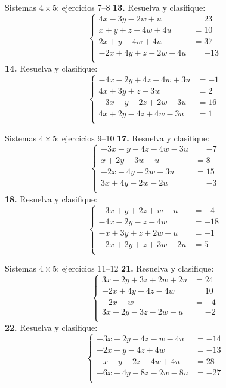 \documentclass[aspectratio=169]{beamer}
\begin{document}
\begin{frame}{Sistemas $4\times 5$: ejercicios 7--8}
\scriptsize
\textbf{13.} Resuelva y clasifique:
\[\left\{\begin{aligned}
4x-3y-2w+u&=23\\
x+y+z+4w+4u&=10\\
2x+y-4w+4u&=37\\
-2x+4y+z-2w-4u&=-13\\
\end{aligned}\right.\]
\textbf{14.} Resuelva y clasifique:
\[\left\{\begin{aligned}
-4x-2y+4z-4w+3u&=-1\\
4x+3y+z+3w&=2\\
-3x-y-2z+2w+3u&=16\\
4x+2y-4z+4w-3u&=1\\
\end{aligned}\right.\]
\end{frame}
\begin{frame}{Sistemas $4\times 5$: ejercicios 9--10}
\scriptsize
\textbf{17.} Resuelva y clasifique:
\[\left\{\begin{aligned}
-3x-y-4z-4w-3u&=-7\\
x+2y+3w-u&=8\\
-2x-4y+2w-3u&=15\\
3x+4y-2w-2u&=-3\\
\end{aligned}\right.\]
\textbf{18.} Resuelva y clasifique:
\[\left\{\begin{aligned}
-3x+y+2z+w-u&=-4\\
-4x-2y-z-4w&=-18\\
-x+3y+z+2w+u&=-1\\
-2x+2y+z+3w-2u&=5\\
\end{aligned}\right.\]
\end{frame}
\begin{frame}{Sistemas $4\times 5$: ejercicios 11--12}
\scriptsize
\textbf{21.} Resuelva y clasifique:
\[\left\{\begin{aligned}
3x-2y+3z+2w+2u&=24\\
-2x+4y+4z-4w&=10\\
-2x-w&=-4\\
3x+2y-3z-2w-u&=-2\\
\end{aligned}\right.\]
\textbf{22.} Resuelva y clasifique:
\[\left\{\begin{aligned}
-3x-2y-4z-w-4u&=-14\\
-2x-y-4z+4w&=-13\\
-x-y-2z-4w+4u&=28\\
-6x-4y-8z-2w-8u&=-27\\
\end{aligned}\right.\]
\end{frame}
\end{document}

